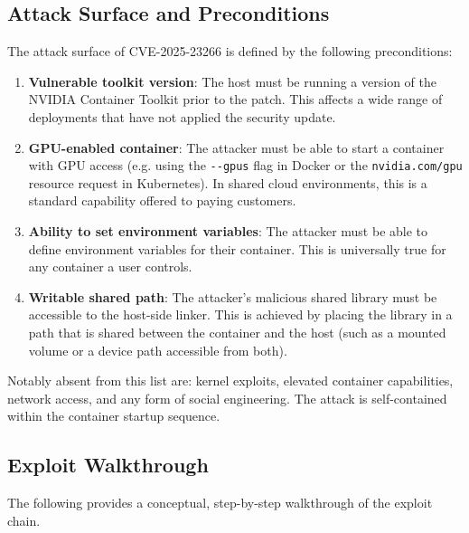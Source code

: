 \subsection{Attack Surface and Preconditions}
\label{subsec:attack-surface}

The attack surface of CVE-2025-23266 is defined by the following preconditions:

\begin{enumerate}
  \item \textbf{Vulnerable toolkit version}: The host must be running a version of the NVIDIA Container Toolkit prior to the patch. This affects a wide range of deployments that have not applied the security update.
  \item \textbf{GPU-enabled container}: The attacker must be able to start a container with GPU access (e.g. using the \texttt{-{}-gpus} flag in Docker or the \texttt{nvidia.com/gpu} resource request in Kubernetes). In shared cloud environments, this is a standard capability offered to paying customers.
  \item \textbf{Ability to set environment variables}: The attacker must be able to define environment variables for their container. This is universally true for any container a user controls.
  \item \textbf{Writable shared path}: The attacker's malicious shared library must be accessible to the host-side linker. This is achieved by placing the library in a path that is shared between the container and the host (such as a mounted volume or a device path accessible from both).
\end{enumerate}
 
Notably absent from this list are: kernel exploits, elevated container capabilities, network access, and any form of social engineering. The attack is self-contained within the container startup sequence.

\subsection{Exploit Walkthrough}
\label{subsec:exploit-walkthrough}

The following provides a conceptual, step-by-step walkthrough of the exploit chain.

